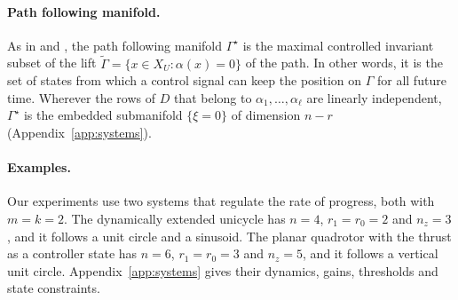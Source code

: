 \documentclass{l4dc2027}
\begin{document}
\paragraph{Path following manifold.} As in \citet{nielsen2006} and \citet{akhtar2015}, the path following manifold $\Gamma^\star$ is the maximal controlled invariant subset of the lift $\tilde\Gamma=\{x\in X_U:\alpha(x)=0\}$ of the path. In other words, it is the set of states from which a control signal can keep the position on $\Gamma$ for all future time. Wherever the rows of $D$ that belong to $\alpha_1,\dots,\alpha_\ell$ are linearly independent, $\Gamma^\star$ is the embedded submanifold $\{\xi=0\}$ of dimension $n-r$ (Appendix~\ref{app:systems}).

\paragraph{Examples.} Our experiments use two systems that regulate the rate of progress, both with $m=k=2$. The dynamically extended unicycle has $n=4$, $r_1=r_0=2$ and $n_z=3$, and it follows a unit circle and a sinusoid. The planar quadrotor with the thrust as a controller state has $n=6$, $r_1=r_0=3$ and $n_z=5$, and it follows a vertical unit circle. Appendix~\ref{app:systems} gives their dynamics, gains, thresholds and state constraints.

\vspace{-0.075in}
\end{document}
